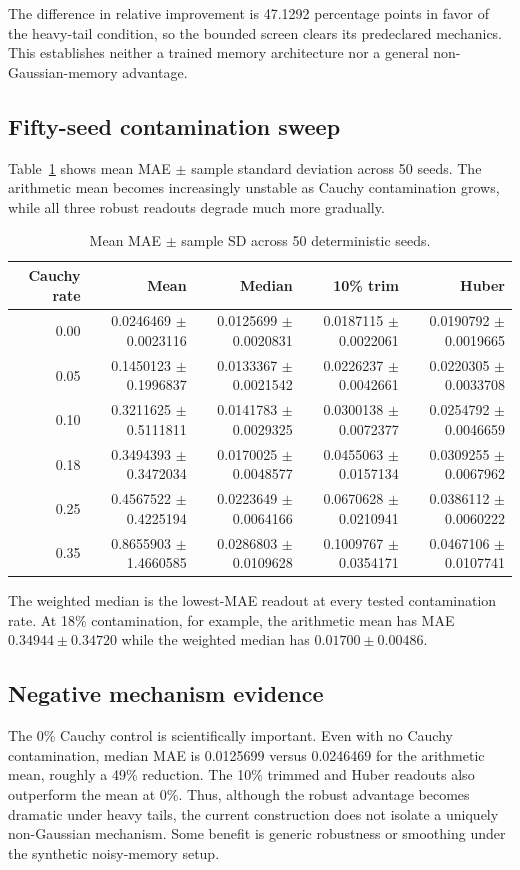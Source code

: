 \documentclass[10pt]{article}
\begin{document}
The difference in relative improvement is 47.1292 percentage points in favor of the heavy-tail condition, so the bounded screen clears its predeclared mechanics. This establishes neither a trained memory architecture nor a general non-Gaussian-memory advantage.

\subsection{Fifty-seed contamination sweep}
Table~\ref{tab:sweep} shows mean MAE $\pm$ sample standard deviation across 50 seeds. The arithmetic mean becomes increasingly unstable as Cauchy contamination grows, while all three robust readouts degrade much more gradually.

\begin{table}[h]
\centering
\small
\caption{Mean MAE $\pm$ sample SD across 50 deterministic seeds.}
\label{tab:sweep}
\begin{tabular}{rrrrr}
\toprule
Cauchy rate & Mean & Median & 10\% trim & Huber \\
\midrule
0.00 & 0.0246469 $\pm$ 0.0023116 & 0.0125699 $\pm$ 0.0020831 & 0.0187115 $\pm$ 0.0022061 & 0.0190792 $\pm$ 0.0019665 \\
0.05 & 0.1450123 $\pm$ 0.1996837 & 0.0133367 $\pm$ 0.0021542 & 0.0226237 $\pm$ 0.0042661 & 0.0220305 $\pm$ 0.0033708 \\
0.10 & 0.3211625 $\pm$ 0.5111811 & 0.0141783 $\pm$ 0.0029325 & 0.0300138 $\pm$ 0.0072377 & 0.0254792 $\pm$ 0.0046659 \\
0.18 & 0.3494393 $\pm$ 0.3472034 & 0.0170025 $\pm$ 0.0048577 & 0.0455063 $\pm$ 0.0157134 & 0.0309255 $\pm$ 0.0067962 \\
0.25 & 0.4567522 $\pm$ 0.4225194 & 0.0223649 $\pm$ 0.0064166 & 0.0670628 $\pm$ 0.0210941 & 0.0386112 $\pm$ 0.0060222 \\
0.35 & 0.8655903 $\pm$ 1.4660585 & 0.0286803 $\pm$ 0.0109628 & 0.1009767 $\pm$ 0.0354171 & 0.0467106 $\pm$ 0.0107741 \\
\bottomrule
\end{tabular}
\end{table}

The weighted median is the lowest-MAE readout at every tested contamination rate. At 18\% contamination, for example, the arithmetic mean has MAE $0.34944\pm0.34720$ while the weighted median has $0.01700\pm0.00486$.

\subsection{Negative mechanism evidence}
The 0\% Cauchy control is scientifically important. Even with no Cauchy contamination, median MAE is 0.0125699 versus 0.0246469 for the arithmetic mean, roughly a 49\% reduction. The 10\% trimmed and Huber readouts also outperform the mean at 0\%. Thus, although the robust advantage becomes dramatic under heavy tails, the current construction does not isolate a uniquely non-Gaussian mechanism. Some benefit is generic robustness or smoothing under the synthetic noisy-memory setup.
\end{document}

